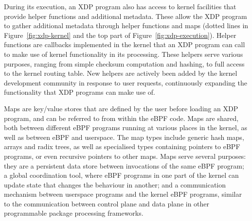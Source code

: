 \documentclass[10pt,sigconf]{acmart}
\begin{document}
During its execution, an XDP program also has access to kernel facilities that
provide helper functions and additional metadata. These allow the XDP program to
gather additional metadata through helper functions and maps (dotted lines in
Figure~\ref{fig:xdp-kernel} and the top part of Figure~\ref{fig:xdp-execution}).
%
%
%
%
Helper functions are callbacks implemented in the kernel that an XDP program can
call to make use of kernel functionality in its processing. These helpers
serve various purposes, ranging from simple checksum computation and hashing, to
full access to the kernel routing table. New helpers are actively been added by
the kernel development community in response to user requests, continuously
expanding the functionality that XDP programs can make use of.

Maps are key/value stores that are defined by the user before loading an XDP
program, and can be referred to from within the eBPF code. Maps are shared, both
between different eBPF programs running at various places in the kernel, as well
as between eBPF and userspace. The map types include generic hash maps, arrays
and radix trees, as well as specialised types containing pointers to eBPF
programs, or even recursive pointers to other maps. Maps serve several purposes:
they are a persistent data store between invocations of the same eBPF program; a
global coordination tool, where eBPF programs in one part of the kernel can
update state that changes the behaviour in another; and a communication
mechanism between userspace programs and the kernel eBPF programs, similar to
the communication between control plane and data plane in other programmable
package processing frameworks.
\end{document}
